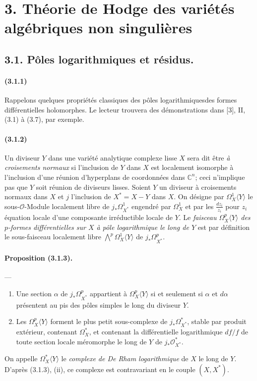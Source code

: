 \documentclass[10pt]{article}
\newcommand{\C}{\mathbb C}
\newcommand{\fg}{\guillemotright}
\newcommand{\og}{\guillemotleft}
\providecommand{\cO}{\mathcal O}
\providecommand{\cO}{\mathcal O}
\begin{document}
\section*{3. Théorie de Hodge des variétés algébriques non singulières}

\subsection*{3.1. Pôles logarithmiques et résidus.}

\paragraph{(3.1.1)} Rappelons quelques propriétés classiques des \og pôles logarithmiques\fg des formes différentielles holomorphes. Le lecteur trouvera des démonstrations dans [3], II, (3.1) à (3.7), par exemple.

\paragraph{(3.1.2)} Un diviseur $Y$ dans une variété analytique complexe lisse $X$ sera dit être \emph{à croisements normaux} si l'inclusion de $Y$ dans $X$ est localement isomorphe à l'inclusion d'une réunion d'hyperplans de coordonnées dans $\C^n$; ceci n'implique pas que $Y$ soit réunion de diviseurs lisses. Soient $Y$ un diviseur à croisements normaux dans $X$ et $j$ l'inclusion de $X^*=X-Y$ dans $X$. On désigne par $\Omega_X^1\langle Y\rangle$ le sous-$\cO$-Module localement libre de $j_*\Omega_{X^*}^1$ engendré par $\Omega_X^1$ et par les $\frac{dz_i}{z_i}$ pour $z_i$ équation locale d'une composante irréductible locale de $Y$. Le \emph{faisceau $\Omega_X^p\langle Y\rangle$ des $p$-formes différentielles sur $X$ à pôle logarithmique le long de $Y$} est par définition le sous-faisceau localement libre $\bigwedge^p\Omega_X^1\langle Y\rangle$ de $j_*\Omega_{X^*}^p$.

\paragraph{Proposition (3.1.3).} --- {\itshape
\begin{enumerate}[label=(\roman*)]
\item Une section $\alpha$ de $j_*\Omega_{X^*}^p$ appartient à $\Omega_X^p\langle Y\rangle$ si et seulement si $\alpha$ et $d\alpha$ présentent au pis des pôles simples le long du diviseur $Y$.
\item Les $\Omega_X^p\langle Y\rangle$ forment le plus petit sous-complexe de $j_*\Omega_{X^*}^*$, stable par produit extérieur, contenant $\Omega_X^*$, et contenant la différentielle logarithmique $df/f$ de toute section locale méromorphe le long de $Y$ de $j_*\cO_{X^*}^*$.
\end{enumerate}}
On appelle $\Omega_X^*\langle Y\rangle$ le \emph{complexe de De Rham logarithmique} de $X$ le long de $Y$. D'après (3.1.3), (ii), ce complexe est contravariant en le couple $(X,X^*)$.
\end{document}
